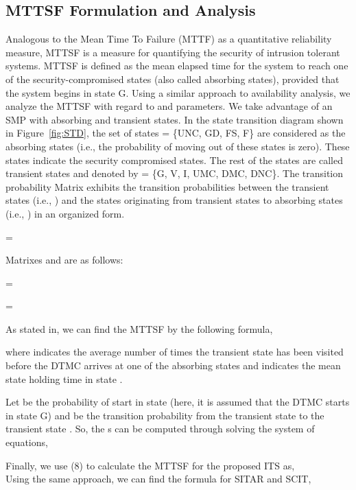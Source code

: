 \documentclass[preprint,number,12pt]{elsarticle}
\begin{document}
\subsection{MTTSF Formulation and Analysis}
Analogous to the Mean Time To Failure (MTTF) as a quantitative reliability measure, MTTSF is a measure for quantifying the security of intrusion tolerant systems\citep{Madan2004167}. MTTSF is defined as the mean elapsed time for the system to reach one of the security-compromised states (also called absorbing states), provided that the system begins in state G. Using a similar approach to availability analysis, we analyze the MTTSF with regard to  and  parameters. We take advantage of an SMP with absorbing and transient states. In the state transition diagram shown in Figure~\ref{fig:STD}, the set of states  = \{UNC, GD, FS, F\} are considered as the absorbing states (i.e., the probability of moving out of these states is zero). These states indicate the security compromised states. The rest of the states are called transient states and denoted by  = \{G, V, I, UMC, DMC, DNC\}. The transition probability Matrix  exhibits the transition probabilities between the transient states (i.e., ) and the states originating from transient states to absorbing states (i.e., ) in an organized form.

\begin{center}
{} =
\end{center}

Matrixes  and  are as follows:

\begin{center}
{} = 
\end{center}

\begin{center}
{ } =  
\end{center}

As stated in\citep{Madan2004167}, we can find the MTTSF by the following formula,

where  indicates the average number of times the transient state  has been visited before the DTMC arrives at one of the absorbing states and  indicates the mean state holding time in state .

Let  be the probability of start in state  (here, it is assumed that the DTMC starts in state G) and    be the transition probability from the transient state  to the transient state . So, the s can be computed through solving the system of equations,

Finally, we use (8) to calculate the MTTSF for the proposed ITS as,
\\
Using the same approach, we can find the formula for SITAR\citep{Madan2004167} and SCIT,
\end{document}
